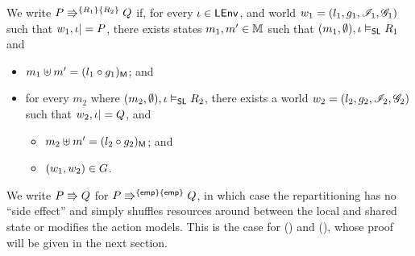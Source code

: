 \begin{definition}[Repartitioning] \label{def:repartitioning}
  We write $\repartitions{P}{Q}{R_1}{R_2}$ if, for every $\lenv \in
  \LEnv$, and world $w_1 = (l_1,g_1,\lmod_1,\gmod_1)$ such that $w_1,
  \lenv |= P$, there exists states $m_1,m' \in \Heaps$ such that
  $(m_1, \emptyset), \lenv \slsat R_1$ and
\begin{itemize} 
\item $m_1 \composeH m' = \heapPart{(l_1\composeL g_1)}$; and
\item for every $m_2$ where $(m_2, \emptyset), \lenv \slsat R_2$,
  there exists a world $w_2 = (l_2,g_2,\lmod_2,\gmod_2)$ such that
  $w_2, \lenv |= Q$, and
  \begin{itemize}
  \item $m_2 \composeH m' = \heapPart{(l_2 \composeL g_2)}$; and
  \item $(w_1, w_2) \in \guarantee$.
  \end{itemize}
\end{itemize}
\end{definition}

We write $P \semimplies Q$ for $\repartitions{P}{Q}{\emp}{\emp} $, in
which case the repartitioning has no ``side effect'' and simply
shuffles resources around between the local and shared state or
modifies the action models. This is the case for (\shiftRule) and
(\extendRule), whose proof will be given in the next section.

%	
%
%

